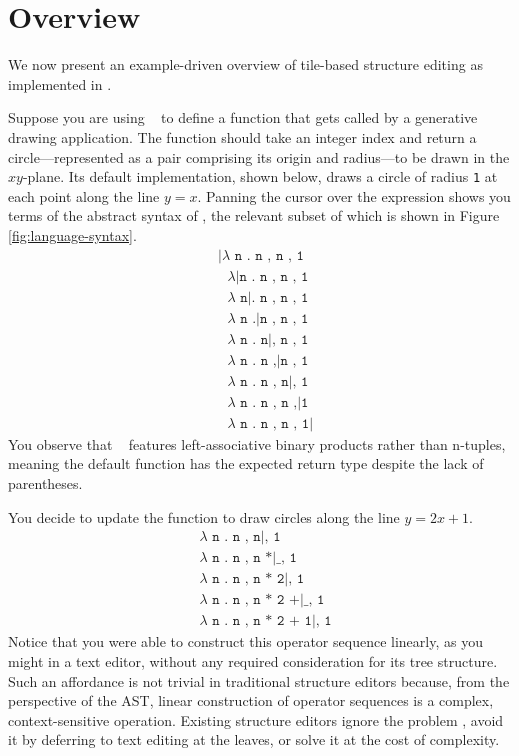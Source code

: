 \section{Overview}\label{sec:overview}


We now present an example-driven overview of tile-based
structure editing as implemented in \tylr.

Suppose you are using \tylr~ to define a function that gets called by a
generative drawing application.
The function should take an integer index and
return a circle---represented as a pair comprising
its origin and radius---to be drawn in the $xy$-plane.
Its default implementation, shown below, draws a circle
of radius \texttt{1} at each point along the line $y = x$.
Panning the cursor over the expression shows you terms of
the abstract syntax of \tylr, the relevant subset of which
is shown in Figure \ref{fig:language-syntax}.
\begin{align*}
  & \texttt{|$\lambda$ n . n , n , 1} \\
  & \texttt{\ $\lambda$|n . n , n , 1} \\
  & \texttt{\ $\lambda$ n|. n , n , 1} \\
  & \texttt{\ $\lambda$ n .|n , n , 1} \\
  & \texttt{\ $\lambda$ n . n|, n , 1} \\
  & \texttt{\ $\lambda$ n . n ,|n , 1} \\
  & \texttt{\ $\lambda$ n . n , n|, 1} \\
  & \texttt{\ $\lambda$ n . n , n ,|1} \\
  & \texttt{\ $\lambda$ n . n , n , 1|}
\end{align*}
You observe that \tylr~ features left-associative binary
products rather than n-tuples, meaning the default function
has the expected return type despite the lack of parentheses.

You decide to update the function to draw circles along the
line $y = 2x + 1$.
\begin{align*}
  & \texttt{$\lambda$ n . n , n|, 1} \\
  & \texttt{$\lambda$ n . n , n *|\_ , 1} \\
  & \texttt{$\lambda$ n . n , n * 2|, 1} \\
  & \texttt{$\lambda$ n . n , n * 2 +|\_ , 1} \\
  & \texttt{$\lambda$ n . n , n * 2 + 1|, 1}
\end{align*}
Notice that you were able to construct this operator sequence
linearly, as you might in a text editor, without any
required consideration for its tree structure.
Such an affordance is not trivial
in traditional structure editors because,
from the perspective of the AST, linear construction of
operator sequences is a complex, context-sensitive operation.
Existing structure editors ignore the problem ,
avoid it by deferring to text editing at the leaves,
or solve it at the cost of complexity.

